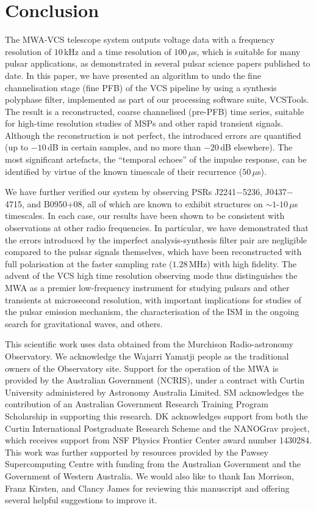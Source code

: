 \documentclass{pasa}%
\newcommand{\vcstools}{VCSTools}
\newcommand{\psrslowB}{B0950$+$08}
\newcommand{\psrkaurJ}{J2241$-$5236}
\newcommand{\psrbhatJ}{J0437$-$4715}
\begin{document}
\section{Conclusion}

The MWA-VCS telescope system outputs voltage data with a frequency resolution of $10\,$kHz and a time resolution of $100\,\mu$s, which is suitable for many pulsar applications, as demonstrated in several pulsar science papers published to date.
In this paper, we have presented an algorithm to undo the fine channelisation stage (fine PFB) of the VCS pipeline by using a synthesis polyphase filter, implemented as part of our processing software suite, \vcstools{}.
The result is a reconstructed, coarse channelised (pre-PFB) time series, suitable for high-time resolution studies of MSPs and other rapid transient signals.
Although the reconstruction is not perfect, the introduced errors are quantified (up to $-10\,$dB in certain samples, and no more than $-20\,$dB elsewhere).
The most significant artefacts, the ``temporal echoes'' of the impulse response, can be identified by virtue of the known timescale of their recurrence ($50\,\mu$s).

We have further verified our system by observing PSRs \psrkaurJ{}, \psrbhatJ{}, and \psrslowB{}, all of which are known to exhibit structures on $\sim 1$-$10\,\mu$s timescales.
In each case, our results have been shown to be consistent with observations at other radio frequencies.
In particular, we have demonstrated that the errors introduced by the imperfect analysis-synthesis filter pair are negligible compared to the pulsar signals themselves, which have been reconstructed with full polarisation at the faster sampling rate ($1.28\,$MHz) with high fidelity.
The advent of the VCS high time resolution observing mode thus distinguishes the MWA as a premier low-frequency instrument for studying pulsars and other transients at microsecond resolution, with important implications for studies of the pulsar emission mechanism, the characterisation of the ISM in the ongoing search for gravitational waves, and others.

\begin{acknowledgements}
This scientific work uses data obtained from the Murchison Radio-astronomy Observatory. We acknowledge the Wajarri Yamatji people as the traditional owners of the Observatory site.
Support for the operation of the MWA is provided by the Australian Government (NCRIS), under a contract with Curtin University administered by Astronomy Australia Limited.
SM acknowledges the contribution of an Australian Government Research Training Program Scholarship in supporting this research.
DK acknowledges support from both the Curtin International Postgraduate Research Scheme and the NANOGrav project, which receives support from NSF Physics Frontier Center award number 1430284.
This work was further supported by resources provided by the Pawsey Supercomputing Centre with funding from the Australian Government and the Government of Western Australia.
We would also like to thank Ian Morrison, Franz Kirsten, and Clancy James for reviewing this manuscript and offering several helpful suggestions to improve it.
\end{acknowledgements}
\end{document}
